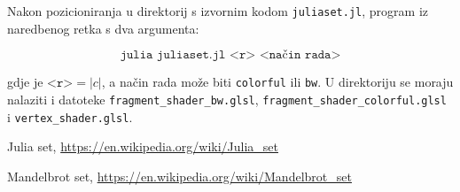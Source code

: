 \documentclass[a4paper]{article}
\begin{document}
Nakon pozicioniranja u direktorij s izvornim kodom \texttt{juliaset.jl}, program 
iz naredbenog retka s dva argumenta:

$$\texttt{julia juliaset.jl <r> <način rada>}$$

gdje je $\texttt{<r>} = |c|$, a način rada može biti \texttt{colorful} ili 
\texttt{bw}. U direktoriju se moraju nalaziti i datoteke 
\texttt{fragment\_shader\_bw.glsl}, \texttt{fragment\_shader\_colorful.glsl} i 
\texttt{vertex\_shader.glsl}.

\begin{thebibliography}{2}

 Julia set, \url{https://en.wikipedia.org/wiki/Julia\_set}

 Mandelbrot set, 
\url{https://en.wikipedia.org/wiki/Mandelbrot\_set}

\end{thebibliography}
\end{document}
